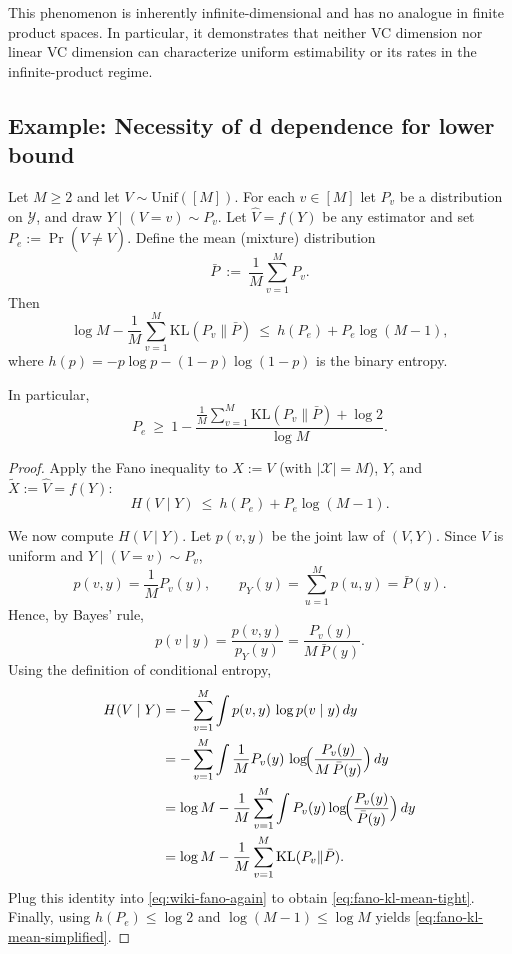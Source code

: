 \documentclass[arxiv]{colt2026}
\newcommand{\X}{\mathcal{X}}
\newcommand{\Y}{\mathcal{Y}}
\newcommand{\KL}{\mathrm{KL}}
\newcommand{\Unif}{\mathrm{Unif}}
\begin{document}
This phenomenon is inherently infinite-dimensional and has no analogue in
finite product spaces.
In particular, it demonstrates that neither VC dimension nor linear VC
dimension can characterize uniform estimability or its rates in the
infinite-product regime.
\subsection{Example: Necessity of d dependence for lower bound}
\begin{lemma}
\label{lem:fano-kl-mean}
Let $M\ge 2$ and let $V\sim\Unif([M])$.
For each $v\in[M]$ let $P_v$ be a distribution on $\Y$, and draw
$Y\mid(V=v)\sim P_v$.
Let $\widehat V=f(Y)$ be any estimator and set $P_e:=\Pr(\widehat V\neq V)$.
Define the mean (mixture) distribution
\[
\bar P \ :=\ \frac1M\sum_{v=1}^M P_v.
\]
Then
\begin{equation}
\log M - \frac1M\sum_{v=1}^M \KL(P_v\|\bar P)
\ \le\ h(P_e)+P_e\log(M-1),
\label{eq:fano-kl-mean-tight}
\end{equation}
where $h(p)=-p\log p-(1-p)\log(1-p)$ is the binary entropy.

In particular,
\begin{equation}
P_e
\ \ge\
1-\frac{\frac1M\sum_{v=1}^M \KL(P_v\|\bar P)+\log 2}{\log M}.
\label{eq:fano-kl-mean-simplified}
\end{equation}
\end{lemma}

\begin{proof}
Apply the  Fano inequality to $X:=V$ (with $|\X|=M$), $Y$, and
$\tilde X:=\widehat V=f(Y)$:
\begin{equation}
H(V\mid Y)\ \le\ h(P_e)+P_e\log(M-1).
\label{eq:wiki-fano-again}
\end{equation}

We now compute $H(V\mid Y)$.
Let $p(v,y)$ be the joint law of $(V,Y)$. Since $V$ is uniform and
$Y\mid(V=v)\sim P_v$,
\[
p(v,y)=\frac1M P_v(y),
\qquad
p_Y(y)=\sum_{u=1}^M p(u,y)=\bar P(y).
\]
Hence, by Bayes' rule,
\[
p(v\mid y)=\frac{p(v,y)}{p_Y(y)}=\frac{P_v(y)}{M\,\bar P(y)}.
\]
Using the definition of conditional entropy,
\begin{align*}
H(V\mid Y)
&= -\sum_{v=1}^M \int p(v,y)\,\log p(v\mid y)\,dy \\
&= -\sum_{v=1}^M \int \frac1M P_v(y)\,
\log\!\Bigl(\frac{P_v(y)}{M\,\bar P(y)}\Bigr)\,dy \\
&= \log M - \frac1M\sum_{v=1}^M \int P_v(y)\log\!\Bigl(\frac{P_v(y)}{\bar P(y)}\Bigr)\,dy \\
&= \log M - \frac1M\sum_{v=1}^M \KL(P_v\|\bar P).
\end{align*}
Plug this identity into \eqref{eq:wiki-fano-again} to obtain
\eqref{eq:fano-kl-mean-tight}. Finally, using $h(P_e)\le \log 2$ and
$\log(M-1)\le \log M$ yields \eqref{eq:fano-kl-mean-simplified}.
\end{proof}
\end{document}
